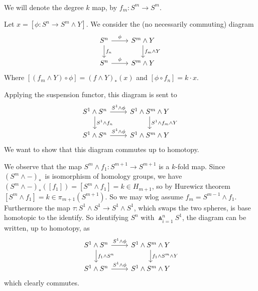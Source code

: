 

\mmaketitle

\begin{exercise}[1 \& 2]\ 

We will denote the degree $k$ map, by $f_m : S^m \to S^m$. 

Let $x = [\phi : S^n \to S^m \wedge Y]$. 
We consider the (no necessarily commuting) diagram 
\[ \begin{tikzcd}
S^n \arrow[r, "\phi"] \arrow[d, "f_n"]& S^m \wedge Y \arrow[d, "f_m \wedge Y"]
\\
S^n \arrow[r, "\phi"] & S^m \wedge Y
\end{tikzcd}  \]
Where $[ (f_m \wedge Y) \circ \phi ] = (f\wedge Y)_*(x)$ and $[ \phi \circ f_n ]
= k \cdot x$. 

Applying the suspension functor, this diagram is sent to 
\[ \begin{tikzcd}
S^1 \wedge S^n \arrow[r, "S^1 \wedge \phi"] \arrow[d, "S^1 \wedge f_n"]& S^1 \wedge S^m \wedge Y \arrow[d, "S^1 \wedge f_m \wedge Y"]
\\
S^1 \wedge S^n \arrow[r, "S^1 \wedge \phi"] & S^1 \wedge S^m \wedge Y
\end{tikzcd}  \]
We want to show that this diagram commutes up to homotopy.

We observe that the map $S^m \wedge f_1 : S^{m+1} \to S^{m+1}$ is a $k$-fold
map. Since $(S^m \wedge -)_*$ is isomorphism of homology groups, we have $(S^m
\wedge -)_*([f_1]) = [S^m \wedge f_1] = k \in H_{m+1}$, so by Hurewicz theorem $[S^m \wedge f_1] = k \in \pi_{m+1}(S^{m+1})$.
So we may wlog assume $f_m = S^{m-1} \wedge f_1$. 
Furthermore the map $\tau : S^1 \wedge S^1 \to S^1 \wedge S^1$, which swaps the two
spheres, is base homotopic to the identify. So identifying $S^n$ with
$\Wedge_{i=1}^n S^1$, the diagram can be written, up to homotopy, as 
\[ \begin{tikzcd}
S^1 \wedge S^n \arrow[r, "S^1 \wedge \phi"] \arrow[d, "f_1 \wedge S^n"]& S^1 \wedge S^m \wedge Y \arrow[d, " f_1 \wedge S^m \wedge Y"]
\\
S^1 \wedge S^n \arrow[r, "S^1 \wedge \phi"] & S^1 \wedge S^m \wedge Y
\end{tikzcd}  \]
which clearly commutes.


\end{exercise}
